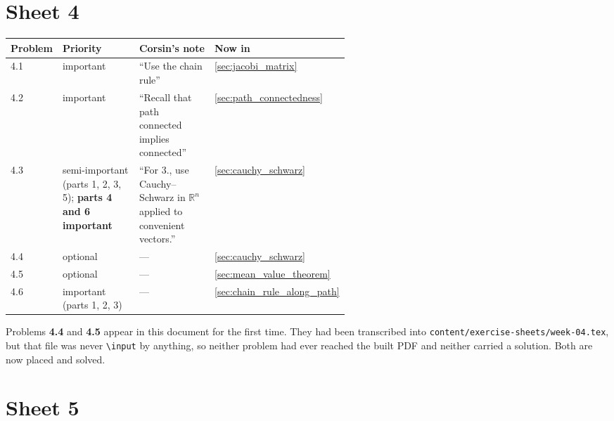 \section{Sheet 4}
\label{sec:sheet_index_4}

\begin{center}
\begin{tabular}{@{}l p{0.28\linewidth} p{0.28\linewidth} l@{}}
\textbf{Problem} & \textbf{Priority} & \textbf{Corsin's note} & \textbf{Now in} \\
\hline
4.1 & important & ``Use the chain rule'' & \cref{sec:jacobi_matrix} \\[3pt]
4.2 & important & ``Recall that path connected implies connected'' & \cref{sec:path_connectedness} \\[3pt]
4.3 & semi-important (parts 1, 2, 3, 5); \textbf{parts 4 and 6 important} &
  ``For 3., use Cauchy--Schwarz in $\mathbb{R}^n$ applied to convenient vectors.'' &
  \cref{sec:cauchy_schwarz} \\[3pt]
4.4 & optional & --- & \cref{sec:cauchy_schwarz} \\[3pt]
4.5 & optional & --- & \cref{sec:mean_value_theorem} \\[3pt]
4.6 & important (parts 1, 2, 3) & --- & \cref{sec:chain_rule_along_path} \\
\end{tabular}
\end{center}

\begin{ainote}
Problems \textbf{4.4} and \textbf{4.5} appear in this document for the first time. They had been
transcribed into \texttt{content/exercise-sheets/week-04.tex}, but that file was never
\texttt{\textbackslash input} by anything, so neither problem had ever reached the built PDF and
neither carried a solution. Both are now placed and solved.
\end{ainote}

\section{Sheet 5}
\label{sec:sheet_index_5}

